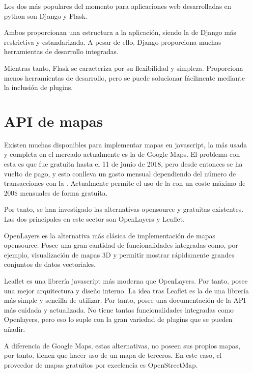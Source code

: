   Los dos  más populares del momento para aplicaciones web desarrolladas en python son Django\cite{django} y Flask\cite{flask}.
  
  Ambos proporcionan una estructura a la aplicación, siendo la de Django más restrictiva y estandarizada. A pesar de ello, Django proporciona muchas herramientas de desarrollo integradas.
  
  Mientras tanto, Flask se caracteriza por su flexibilidad y simpleza. Proporciona menos herramientas de desarrollo, pero se puede solucionar fácilmente mediante la inclusión de plugins.
  

\section{API de mapas}

  Existen muchas  disponibles para implementar mapas en javascript, la más usada y completa en el mercado actualmente es la de Google Maps\cite{gmaps}. El problema con esta  es que fue gratuita hasta el 11 de junio de 2018, pero desde entonces se ha vuelto de pago, y esto conlleva un gasto mensual dependiendo del número de transacciones con la . Actualmente permite el uso de la  con un coste máximo de 200\$ mensuales de forma gratuita.
  
  Por tanto, se han investigado las alternativas opensource y gratuitas existentes. Las dos  principales en este sector son OpenLayers\cite{openlayers} y Leaflet\cite{leaflet}.
  
  OpenLayers es la alternativa más clásica de implementación de mapas opensource. Posee una gran cantidad de funcionalidades integradas como, por ejemplo, visualización de mapas 3D y permitir mostrar rápidamente grandes conjuntos de datos vectoriales.
  
  Leaflet es una librería javascript más moderna que OpenLayers. Por tanto, posee una mejor arquitectura y diseño interno. La idea tras Leaflet es la de una librería más simple y sencilla de utilizar. Por tanto, posee una documentación de la API más cuidada y actualizada. No tiene tantas funcionalidades integradas como Openlayers, pero eso lo suple con la gran variedad de plugins que se pueden añadir.
  
  A diferencia de Google Maps, estas alternativas, no poseen sus propios mapas, por tanto, tienen que hacer uso de un mapa de terceros. En este caso, el proveedor de mapas gratuitos por excelencia es OpenStreetMap\cite{osm}.
